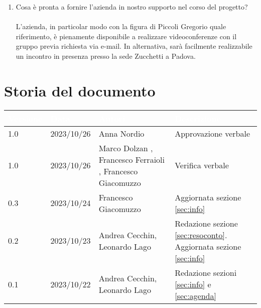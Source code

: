 \documentclass[12pt]{article}
\begin{document}
\begin{enumerate}
    \item Cosa è pronta a fornire l'azienda in nostro supporto nel corso del progetto?\\ \\
L'azienda, in particolar modo con la figura di Piccoli Gregorio quale riferimento, è pienamente disponibile a realizzare videoconferenze con il gruppo previa richiesta via e-mail. In alternativa, sarà facilmente realizzabile un incontro in presenza presso la sede Zucchetti a Padova.
    
\end{enumerate}

\section{Storia del documento} \label{sec:storia}
\begingroup
\setlength{\tabcolsep}{10pt}
\renewcommand{\arraystretch}{1.5}
\begin{tabularx}{\textwidth}{| l | l | X | X |}
    \hline
    \rowcolor{headerrow} \textbf{\textcolor{white}{Versione}} & \textbf{\textcolor{white}{Data}} & \textbf{\textcolor{white}{Autori}} & \textbf{\textcolor{white}{Descrizione}} \\
    \hline
    1.0 & 2023/10/26 & Anna Nordio & Approvazione verbale \\
    \hline
    \hline
    1.0 & 2023/10/26 & Marco Dolzan , Francesco Ferraioli , Francesco Giacomuzzo & Verifica verbale \\
    \hline
    0.3 & 2023/10/24 & Francesco Giacomuzzo & Aggiornata sezione \ref{sec:info}\\
    \hline
    0.2 & 2023/10/23 & Andrea Cecchin, Leonardo Lago & Redazione sezione \ref{sec:resoconto}. Aggiornata sezione \ref{sec:info}\\
    \hline
    0.1 & 2023/10/22 & Andrea Cecchin, Leonardo Lago  & Redazione sezioni \ref{sec:info} e \ref{sec:agenda}\\
    \hline
\end{tabularx}  
\endgroup
\end{document}
